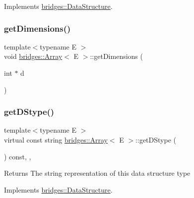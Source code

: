 Implements \mbox{\hyperlink{classbridges_1_1_data_structure}{bridges\+::\+Data\+Structure}}.

\mbox{\label{classbridges_1_1_array_ae195a6f06157e82c68483ff636e30f5e}} 
\subsubsection{\texorpdfstring{get\+Dimensions()}{getDimensions()}}
{\footnotesize\ttfamily template$<$typename E $>$ \\
void \mbox{\hyperlink{classbridges_1_1_array}{bridges\+::\+Array}}$<$ E $>$\+::get\+Dimensions (\begin{DoxyParamCaption}\item[{int $\ast$}]{d }\end{DoxyParamCaption})\hspace{0.3cm}{\ttfamily [inline]}}

\mbox{\label{classbridges_1_1_array_ab93f7379870a7c0bc63490c53d95ba09}} 
\subsubsection{\texorpdfstring{get\+D\+Stype()}{getDStype()}}
{\footnotesize\ttfamily template$<$typename E $>$ \\
virtual const string \mbox{\hyperlink{classbridges_1_1_array}{bridges\+::\+Array}}$<$ E $>$\+::get\+D\+Stype (\begin{DoxyParamCaption}{ }\end{DoxyParamCaption}) const\hspace{0.3cm}{\ttfamily [inline]}, {\ttfamily [override]}, {\ttfamily [virtual]}}

\begin{DoxyReturn}{Returns}
The string representation of this data structure type 
\end{DoxyReturn}


Implements \mbox{\hyperlink{classbridges_1_1_data_structure_a957a63b106e340bc753620c650632bdc}{bridges\+::\+Data\+Structure}}.

\mbox{\label{classbridges_1_1_array_a8b4c6cc491829d814e0b6b0ce3654417}} 
